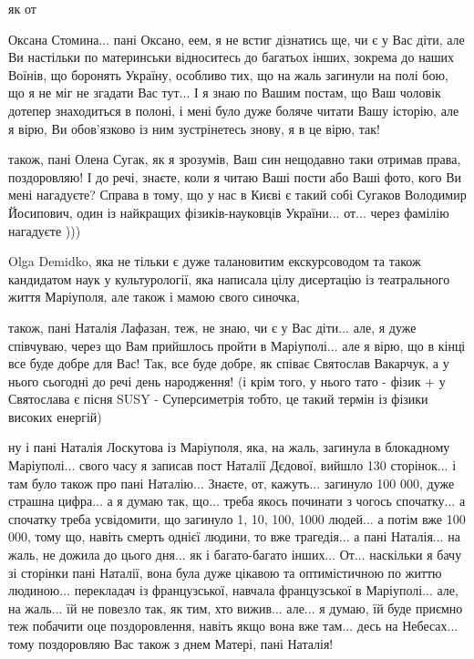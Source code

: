 як от

Оксана Стомина... пані Оксано, еем, я не встиг дізнатись ще, чи є у Вас діти,
але Ви настільки по материнськи відноситесь до багатьох інших, зокрема до наших
Воїнів, що боронять Україну, особливо тих, що на жаль загинули на полі бою, що
я не міг не згадати Вас тут... І я знаю по Вашим постам, що Ваш чоловік дотепер
знаходиться в полоні, і мені було дуже боляче читати Вашу історію, але я вірю,
Ви обов'язково із ним зустрінетесь знову, я в це вірю, так!

також, пані Олена Сугак, як я зрозумів, Ваш син нещодавно таки отримав права,
поздоровляю!  І до речі, знаєте, коли я читаю Ваші пости або Ваші фото, кого Ви
мені нагадуєте? Справа в тому, що у нас в Києві є такий собі Сугаков Володимир
Йосипович, один із найкращих фізиків-науковців України...  от... через фамілію нагадуєте
)))  

Olga Demidko, яка не тільки є дуже талановитим екскурсоводом та також
кандидатом наук у культурології, яка написала цілу дисертацію із театрального
життя Маріуполя, але також і мамою свого синочка,

також, пані Наталія Лафазан, теж, не знаю, чи є у Вас діти...
але, я дуже співчуваю, через що Вам прийшлось пройти в Маріуполі...
але я вірю, що в кінці все буде добре для Вас! Так, все буде добре,
як співає Святослав Вакарчук, а у нього сьогодні до речі день народження! 
(і крім того, у нього тато - фізик + у Святослава є пісня SUSY - Суперсиметрія тобто, це такий термін
із фізики високих енергій)

ну і пані Наталія Лоскутова із Маріуполя, яка, на жаль, загинула в блокадному Маріуполі...
свого часу я записав пост Наталії Дєдової, вийшло 130 сторінок... і там було також про пані Наталію...
Знаєте, от, кажуть... загинуло 100 000, дуже страшна цифра... а я думаю так, що...
треба якось починати з чогось спочатку... а спочатку треба усвідомити, що загинуло
1, 10, 100, 1000 людей... а потім вже 100 000, тому що, навіть смерть однієї людини,
то вже трагедія... а пані Наталія... на жаль, не дожила до цього дня... як і багато-багато інших...
От... наскільки я бачу зі сторінки пані Наталії, вона була дуже цікавою та оптимістичною по життю людиною...
перекладач із французської, навчала французської в Маріуполі... але, на жаль... їй не повезло
так, як тим, хто вижив... але... я думаю, їй буде приємно теж побачити оце поздоровлення,
навіть якщо вона вже там... десь на Небесах... тому поздоровляю Вас також з днем Матері, пані Наталія!


